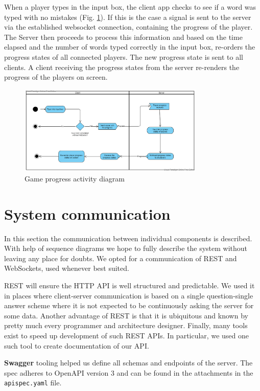 \documentclass[titlepage]{article}
\newcommand{\figref}[1]{{(Fig. \hypersetup{linkcolor=blue}\ref{#1})}}
\begin{document}
When a player types in the input box, the client app checks to see if a word was typed with no mistakes \figref{fig:progress-activity}. If this is the case a signal is sent to the server via the established websocket connection, containing the progress of the player. The Server then proceeds to process this information and based on the time elapsed and the number of words typed correctly in the input box, re-orders the progress states of all connected players. The new progress state is sent to all clients. A client receiving the progress states  from the server re-renders the progress of the players on screen.


\begin{figure}[H]
	\centering
	\includegraphics[width=0.79\textwidth]{activity_diagram_progress.png}
	\caption{Game progress activity diagram}
	\label{fig:progress-activity}
\end{figure}


\section{System communication}

In this section the communication between individual components is described. With help of sequence diagrams we hope to fully describe the system without leaving any place for doubts. We opted for a communication of REST and WebSockets, used whenever best suited.

REST will ensure the HTTP API is well structured and predictable. We used it in places where client-server communication is based on a single question-single answer scheme where it is not expected to be continuously asking the server for some data. Another advantage of REST is that it is ubiquitous and known by pretty much every programmer and architecture designer. Finally, many tools exist to speed up development of such REST APIs. In particular, we used one such tool to create documentation of our API.

\textbf{Swagger} tooling helped us define all schemas and endpoints of the server. The spec adheres to OpenAPI version 3 and can be found in the attachments in the \texttt{apispec.yaml} file.
\end{document}
